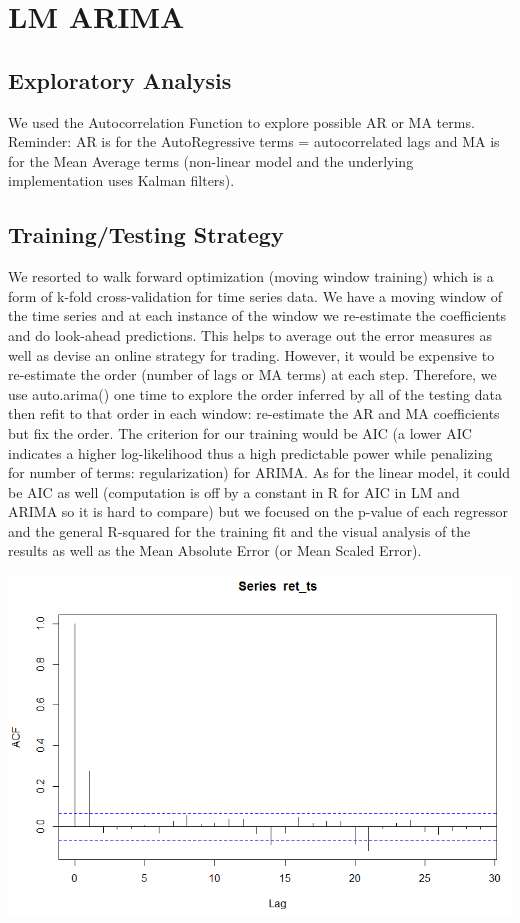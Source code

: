 \documentclass{article}
\begin{document}
	\section{LM ARIMA}
		\subsection{Exploratory Analysis}
		We used the Autocorrelation Function to explore possible AR or MA terms. Reminder: AR is for the AutoRegressive terms = autocorrelated lags and MA is for the Mean Average terms (non-linear model and the underlying implementation uses Kalman filters).
	
		\subsection{Training/Testing Strategy}
	We resorted to walk forward optimization (moving window training) which is a form of k-fold cross-validation for time series data. We have a moving window of the time series and at each instance of the window we re-estimate the coefficients and do look-ahead predictions. This helps to average out the error measures as well as devise an online strategy for trading.
	However, it would be expensive to re-estimate the order (number of lags or MA terms) at each step. Therefore, we use auto.arima() one time to explore the order inferred by all of the testing data then refit to that order in each window: re-estimate the AR and MA coefficients but fix the order. 
	The criterion for our training would be AIC (a lower AIC indicates a higher log-likelihood thus a high predictable power while penalizing for number of terms: regularization) for ARIMA. As for the linear model, it could be AIC as well (computation is off by a constant in R for AIC in LM and ARIMA so it is hard to compare) but we focused on the p-value of each regressor and the general R-squared for the training fit and the visual analysis of the results as well as the Mean Absolute Error (or Mean Scaled Error).
	
\begin{center}	\includegraphics[scale=0.7]{../ACF.PNG}\end{center}
\end{document}
